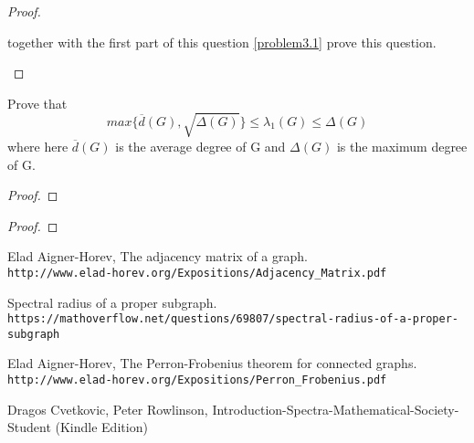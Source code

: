 \documentclass[a4paper, 11pt, oneside]{article}
\newenvironment{problem}[1]
  {\renewcommand\theinnercustomprob{#1}\innercustomprob}
  {\endinnercustomprob}
\begin{document}
\begin{proof}
\begin{enumerate}[(a)]
\cite[Proposition 1.3.9]{introduction-spectra} together with the first part of this question \ref{problem3.1}  prove this question.
\end{enumerate}


\end{proof}		

\begin{problem}{4}\label{problem4}
Prove that
\begin{equation*}
max \Big\{ \overline{d}(G), \sqrt{\Delta(G)} \Big\} \leq \lambda_1(G) \leq \Delta(G)
\end{equation*}
where here $\overline{d}(G)$ is the average degree of G and $\Delta(G)$ is the maximum degree of G.
\end{problem}

\begin{proof}


\end{proof}		

\begin{problem}{5}\label{problem5}
\end{problem}

\begin{proof}

\end{proof}		

 

\begin{thebibliography}{9} 
Elad Aigner-Horev,
The adjacency matrix of a graph.
\\\texttt{http://www.elad-horev.org/Expositions/Adjacency\_Matrix.pdf}

Spectral radius of a proper subgraph.
\\\texttt{https://mathoverflow.net/questions/69807/spectral-radius-of-a-proper-subgraph}

Elad Aigner-Horev,
The Perron-Frobenius theorem for connected graphs.
\\\texttt{http://www.elad-horev.org/Expositions/Perron\_Frobenius.pdf}

Dragos Cvetkovic, Peter Rowlinson,
Introduction-Spectra-Mathematical-Society-Student (Kindle Edition)
\end{thebibliography}
\end{document}
